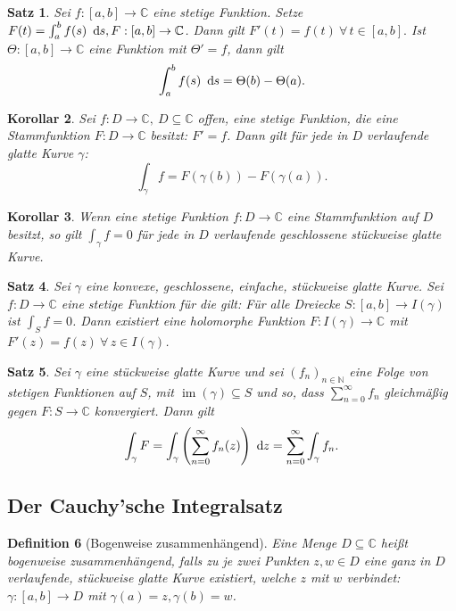 \documentclass[a4paper,12pt]{article}
\theoremstyle{newthm}
\newtheorem{thm}{Satz}[subsection]
\newtheorem{cor}[thm]{Korollar}
\theoremstyle{newdef}
\newtheorem{defn}[thm]{Definition}
\theoremstyle{newrem}
\newcommand{\N}{\mathbb{N}}
\newcommand{\C}{\mathbb{C}}
\renewcommand{\d}{\ \operatorname{d}\hspace{-2px}}
\DeclareMathOperator{\im}{im}
\begin{document}
		\begin{thm}
			Sei $ f:[a,b] \to \C $ eine stetige Funktion. Setze $ F(t) = \int_{a}^b f(s) \d s, F: [a,b] \to \C $. Dann gilt $ F'(t) = f(t) \ \forall\, t \in [a,b]. $ Ist $ \Theta: [a,b] \to \C $ eine Funktion mit $ \Theta' = f $, dann gilt 
			$$ \int_a^b f(s) \d s = \Theta(b) - \Theta(a). $$
		\end{thm}
		
		\begin{cor}
			Sei $ f: D \to \C,\ D \subseteq \C $ offen, eine stetige Funktion, die eine Stammfunktion $ F: D \to \C $ besitzt: $ F' = f $. Dann gilt für jede in $D$ verlaufende glatte Kurve $\gamma$:
			\[ \int_\gamma f = F(\gamma(b)) - F(\gamma(a)). \]
		\end{cor}
		
		\begin{cor}
			Wenn eine stetige Funktion $ f: D \to \C $ eine Stammfunktion auf $D$ besitzt, so gilt $ \int_\gamma f = 0 $ für \emph{jede} in $D$ verlaufende geschlossene stückweise glatte Kurve.
		\end{cor}
		
		\begin{thm}
			Sei $\gamma$ eine konvexe, geschlossene, einfache, stückweise glatte Kurve. Sei $ f: D \to \C $ eine stetige Funktion für die gilt: Für alle Dreiecke $ S: [a,b] \to I(\gamma) $ ist $ \int_S f=0 $. Dann existiert eine holomorphe Funktion $ F: I(\gamma) \to \C $ mit $ F'(z) = f(z) \ \forall\, z \in I(\gamma) $.
		\end{thm}
		
		\begin{thm}
			Sei $\gamma$ eine stückweise glatte Kurve und sei $ (f_n)_{n \in \N} $ eine Folge von stetigen Funktionen auf $S$, mit $ \im(\gamma) \subseteq S $ und so, dass $ \sum\limits_{n=0}^\infty f_n $ gleichmäßig gegen $ F:S \to \C $ konvergiert. Dann gilt
			\[ \int_\gamma F = \int_\gamma \left( \sum_{n=0}^\infty f_n(z) \right) \d z = \sum_{n=0}^\infty \int_\gamma f_n. \]
		\end{thm}
	
	
	
	\subsection{Der Cauchy'sche Integralsatz}
		
		\begin{defn}[Bogenweise zusammenhängend]
			Eine Menge $ D \subseteq \C $ heißt \emph{bogenweise zusammenhängend}, falls zu je zwei Punkten $ z,w \in D $ eine ganz in $D$ verlaufende, stückweise glatte Kurve existiert, welche $z$ mit $w$ verbindet: $ \gamma: [a,b] \to D $ mit $ \gamma(a) = z, \gamma(b)=w $.
		\end{defn}
		
\end{document}
